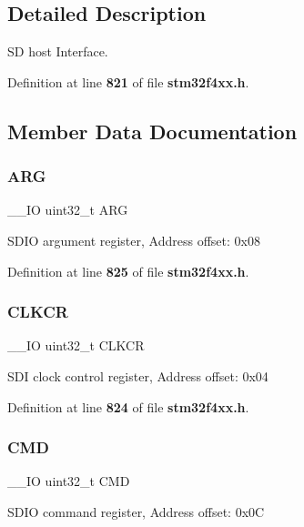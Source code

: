 \subsection{Detailed Description}
SD host Interface. 

Definition at line \textbf{ 821} of file \textbf{ stm32f4xx.\+h}.



\subsection{Member Data Documentation}
\mbox{\label{structSDIO__TypeDef_a07d4e63efcbde252c667e64a8d818aa9}} 
\subsubsection{A\+RG}
{\footnotesize\ttfamily \+\_\+\+\_\+\+IO uint32\+\_\+t A\+RG}

S\+D\+IO argument register, Address offset\+: 0x08 

Definition at line \textbf{ 825} of file \textbf{ stm32f4xx.\+h}.

\mbox{\label{structSDIO__TypeDef_aa94197378e20fc739d269be49d9c5d40}} 
\subsubsection{C\+L\+K\+CR}
{\footnotesize\ttfamily \+\_\+\+\_\+\+IO uint32\+\_\+t C\+L\+K\+CR}

S\+DI clock control register, Address offset\+: 0x04 

Definition at line \textbf{ 824} of file \textbf{ stm32f4xx.\+h}.

\mbox{\label{structSDIO__TypeDef_adcf812cbe5147d300507d59d4a55935d}} 
\subsubsection{C\+MD}
{\footnotesize\ttfamily \+\_\+\+\_\+\+IO uint32\+\_\+t C\+MD}

S\+D\+IO command register, Address offset\+: 0x0C 

